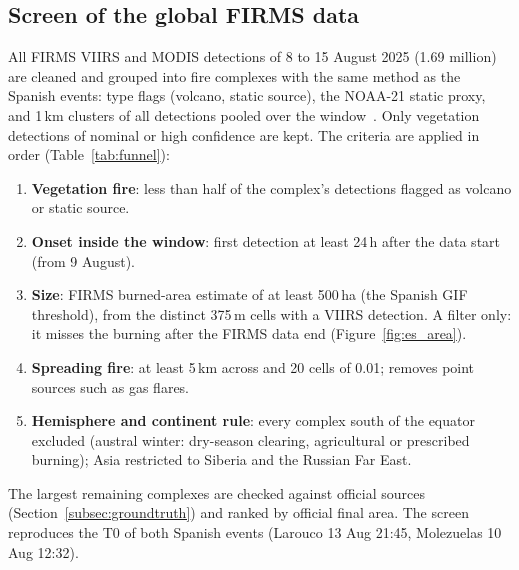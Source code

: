 \documentclass[11pt]{article}
\begin{document}
\subsection{Screen of the global FIRMS data}\label{subsec:screen}

All FIRMS VIIRS and MODIS detections of 8 to 15 August 2025 (1.69 million) are cleaned and grouped into fire complexes with the same method as the Spanish events: type flags (volcano, static source), the NOAA-21 static proxy, and 1\,km clusters of all detections pooled over the window~\cite{schroeder2014viirs, giglio2016modis}. Only vegetation detections of nominal or high confidence are kept. The criteria are applied in order (Table~\ref{tab:funnel}):
\begin{enumerate}[leftmargin=1.2cm]
    \item \textbf{Vegetation fire}: less than half of the complex's detections flagged as volcano or static source.
    \item \textbf{Onset inside the window}: first detection at least 24\,h after the data start (from 9 August).
    \item \textbf{Size}: FIRMS burned-area estimate of at least 500\,ha (the Spanish GIF threshold), from the distinct 375\,m cells with a VIIRS detection. A filter only: it misses the burning after the FIRMS data end (Figure~\ref{fig:es_area}).
    \item \textbf{Spreading fire}: at least 5\,km across and 20 cells of 0.01\textdegree; removes point sources such as gas flares.
    \item \textbf{Hemisphere and continent rule}: every complex south of the equator excluded (austral winter: dry-season clearing, agricultural or prescribed burning); Asia restricted to Siberia and the Russian Far East.
\end{enumerate}
The largest remaining complexes are checked against official sources (Section~\ref{subsec:groundtruth}) and ranked by official final area. The screen reproduces the T0 of both Spanish events (Larouco 13 Aug 21:45, Molezuelas 10 Aug 12:32).
\end{document}
